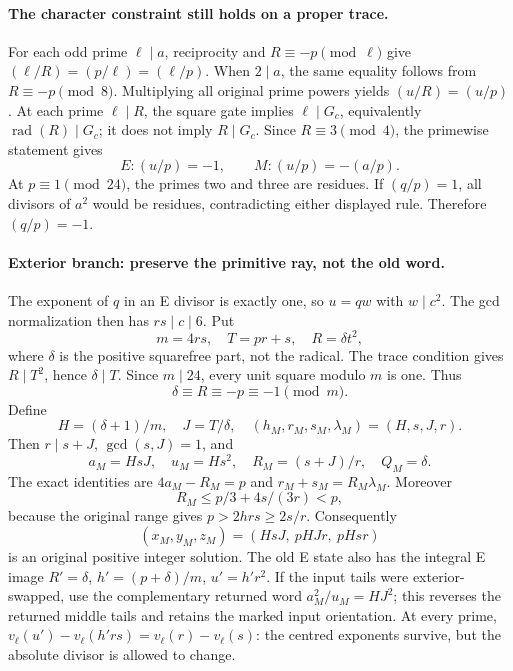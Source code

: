 \documentclass[11pt,reqno]{amsart}
\begin{document}
\paragraph{The character constraint still holds on a proper trace.}
For each odd prime $\ell\mid a$, reciprocity and $R\equiv-p\pmod\ell$ give
$(\ell/R)=(p/\ell)=(\ell/p)$. When $2\mid a$, the same equality follows from
$R\equiv-p\pmod8$. Multiplying all original prime powers yields
$(u/R)=(u/p)$. At each prime \(\ell\mid R\), the square gate implies
\(\ell\mid G_c\), equivalently \(\operatorname{rad}(R)\mid G_c\); it does not
imply \(R\mid G_c\). Since $R\equiv3\pmod4$, the primewise statement gives
\[
 E:(u/p)=-1,\qquad M:(u/p)=-(a/p).
\]
At $p\equiv1\pmod{24}$, the primes two and three are residues. If $(q/p)=1$,
all divisors of $a^2$ would be residues, contradicting either displayed rule.
Therefore $(q/p)=-1$.

\paragraph{Exterior branch: preserve the primitive ray, not the old word.}
The exponent of $q$ in an E divisor is exactly one, so $u=qw$ with $w\mid c^2$.
The gcd normalization then has $rs\mid c\mid6$. Put
\[
 m=4rs,\quad T=pr+s,\quad R=\delta t^2,
\]
where $\delta$ is the positive squarefree part, not the radical. The trace
condition gives $R\mid T^2$, hence $\delta\mid T$. Since $m\mid24$, every unit
square modulo $m$ is one. Thus
\[
 \delta\equiv R\equiv-p\equiv-1\pmod m.
\]
Define
\[
 H=(\delta+1)/m,\quad J=T/\delta,
 \quad(h_M,r_M,s_M,\lambda_M)=(H,s,J,r).
\]
Then $r\mid s+J$, $\gcd(s,J)=1$, and
\[
 a_M=HsJ,\quad u_M=Hs^2,\quad R_M=(s+J)/r,\quad Q_M=\delta.
\]
The exact identities are $4a_M-R_M=p$ and $r_M+s_M=R_M\lambda_M$.
Moreover
\[
 R_M\le p/3+4s/(3r)<p,
\]
because the original range gives $p>2hrs\ge2s/r$. Consequently
\begin{equation}\label{eq:return}
 (x_M,y_M,z_M)=(HsJ,\ pHJr,\ pHsr)
\end{equation}
is an original positive integer solution. The old E state also has the
integral E image $R'=\delta$, $h'=(p+\delta)/m$, $u'=h'r^2$.
If the input tails were exterior-swapped, use the complementary returned word
\(a_M^2/u_M=HJ^2\); this reverses the returned middle tails and retains the
marked input orientation.
At every prime, $v_\ell(u')-v_\ell(h'rs)=v_\ell(r)-v_\ell(s)$:
the centred exponents survive, but the absolute divisor is allowed to change.
\end{document}
